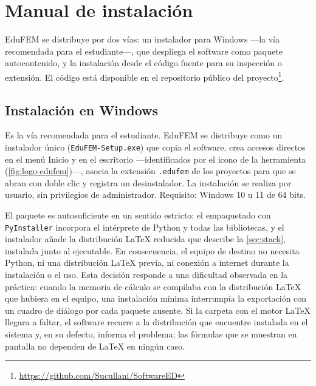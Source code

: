 
\chapter{Manual de instalación}
\label{anexo:instalacion}

EduFEM se distribuye por dos vías: un instalador para Windows —la vía recomendada para el estudiante—, que despliega el software como paquete autocontenido, y la instalación desde el código fuente para su inspección o extensión. El código está disponible en el repositorio público del proyecto\footnote{\url{https://github.com/Sucullani/SoftwareED}}.

\section{Instalación en Windows}

Es la vía recomendada para el estudiante. EduFEM se distribuye como un instalador único (\texttt{EduFEM-Setup.exe}) que copia el software, crea accesos directos en el menú Inicio y en el escritorio —identificados por el icono de la herramienta (\autoref{fig:logo-edufem})—, asocia la extensión \texttt{.edufem} de los proyectos para que se abran con doble clic y registra un desinstalador. La instalación se realiza por usuario, sin privilegios de administrador. Requisito: Windows 10 u 11 de 64 bits.

El paquete es autosuficiente en un sentido estricto: el empaquetado con \texttt{PyInstaller} incorpora el intérprete de Python y todas las bibliotecas, y el instalador añade la distribución \LaTeX{} reducida que describe la \autoref{sec:stack}, instalada junto al ejecutable. En consecuencia, el equipo de destino no necesita Python, ni una distribución \LaTeX{} previa, ni conexión a internet durante la instalación o el uso. Esta decisión responde a una dificultad observada en la práctica: cuando la memoria de cálculo se compilaba con la distribución \LaTeX{} que hubiera en el equipo, una instalación mínima interrumpía la exportación con un cuadro de diálogo por cada paquete ausente. Si la carpeta con el motor \LaTeX{} llegara a faltar, el software recurre a la distribución que encuentre instalada en el sistema y, en su defecto, informa el problema; las fórmulas que se muestran en pantalla no dependen de \LaTeX{} en ningún caso.

